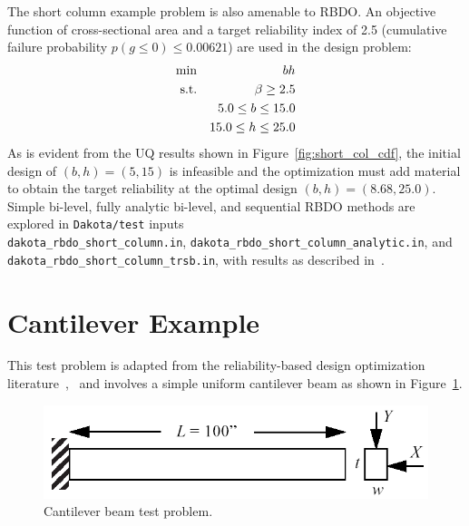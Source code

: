 The short column example problem is also amenable to RBDO.  An
objective function of cross-sectional area and a target reliability
index of 2.5 (cumulative failure probability $p(g \le 0) \le 0.00621$) 
are used in the design problem:
\begin{eqnarray}
\min       & & bh \nonumber \\
{\rm s.t.} & & \beta \geq 2.5 \nonumber \\
           & &  5.0 \leq b \leq 15.0 \nonumber \\
           & & 15.0 \leq h \leq 25.0
\end{eqnarray}
As is evident from the UQ results shown in
Figure~\ref{fig:short_col_cdf}, the initial design of $(b, h) = (5,
15)$ is infeasible and the optimization must add material to obtain
the target reliability at the optimal design $(b, h) = (8.68, 25.0)$.
Simple bi-level, fully analytic bi-level, and sequential RBDO methods
are explored in {\tt Dakota/test} inputs \\
\texttt{dakota\_rbdo\_short\_column.in},
\texttt{dakota\_rbdo\_short\_column\_analytic.in}, and\\
\texttt{dakota\_rbdo\_short\_column\_trsb.in}, with results as
described in~\cite{Eld05,Eld06a}.

\section{Cantilever Example}\label{additional:cantilever}

This test problem is adapted from the reliability-based design
optimization literature~\cite{Sue01},~\cite{Wu01} and involves a simple
uniform cantilever beam as shown in Figure~\ref{additional:figure03}.

\begin{figure}
  \centering
  \includegraphics[scale=0.5]{images/cantilever_beam}
  \caption{Cantilever beam test problem.}
  \label{additional:figure03}
\end{figure}

